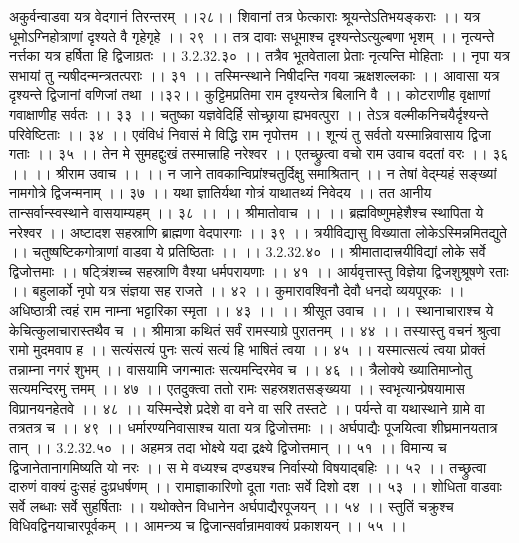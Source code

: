 अकुर्वन्वाडवा यत्र वेदगानं तिरन्तरम् ।।२८।।
शिवानां तत्र फेत्काराः श्रूयन्तेऽतिभयङ्कराः ।।
यत्र धूमोऽग्निहोत्राणां दृश्यते वै गृहेगृहे ।। २९ ।।
तत्र दावाः सधूमाश्च दृश्यन्तेऽत्युल्बणा भृशम् ।।
नृत्यन्ते नर्त्तका यत्र हर्षिता हि द्विजाग्रतः ।। 3.2.32.३० ।।
तत्रैव भूतवेताला प्रेताः नृत्यन्ति मोहिताः ।।
नृपा यत्र सभायां तु न्यषीदन्मन्त्रतत्पराः ।। ३१ ।।
तस्मिन्स्थाने निषीदन्ति गवया ऋक्षशल्लकाः ।।
आवासा यत्र दृश्यन्ते द्विजानां वणिजां तथा ।।३२।।
कुट्टिमप्रतिमा राम दृश्यन्तेत्र बिलानि वै ।।
कोटराणीह वृक्षाणां गवाक्षाणीह सर्वतः ।। ३३ ।।
चतुष्का यज्ञवेदिर्हि सोच्छ्राया ह्यभवत्पुरा ।।
तेऽत्र वल्मीकनिचयैर्दृश्यन्ते परिवेष्टिताः ।। ३४ ।।
एवंविधं निवासं मे विद्धि राम नृपोत्तम ।।
शून्यं तु सर्वतो यस्मान्निवासाय द्विजा गताः ।। ३५ ।।
तेन मे सुमहद्दुःखं तस्मात्त्राहि नरेश्वर ।।
एतच्छ्रुत्वा वचो राम उवाच वदतां वरः ।। ३६ ।।
।। श्रीराम उवाच ।। ।।
न जाने तावकान्विप्रांश्चतुर्दिक्षु समाश्रितान् ।।
न तेषां वेद्म्यहं सङ्ख्यां नामगोत्रे द्विजन्मनाम् ।। ३७ ।।
यथा ज्ञातिर्यथा गोत्रं याथातथ्यं निवेदय ।।
तत आनीय तान्सर्वान्स्वस्थाने वासयाम्यहम् ।। ३८ ।।
।। श्रीमातोवाच ।। ।।
ब्रह्मविष्णुमहेशैश्च स्थापिता ये नरेश्वर ।।
अष्टादश सहस्राणि ब्राह्मणा वेदपारगाः ।। ३९ ।।
त्रयीविद्यासु विख्याता लोकेऽस्मिन्नमितद्युते ।।
चतुष्षष्टिकगोत्राणां वाडवा ये प्रतिष्ठिताः ।। ।। 3.2.32.४० ।।
श्रीमातादात्त्रयीविद्यां लोके सर्वे द्विजोत्तमाः ।।
षट्त्रिंशच्च सहस्राणि वैश्या धर्मपरायणाः ।। ४१ ।।
आर्यवृत्तास्तु विज्ञेया द्विजशुश्रूषणे रताः ।।
बहुलार्को नृपो यत्र संज्ञया सह राजते ।। ४२ ।।
कुमारावश्विनौ देवौ धनदो व्ययपूरकः ।।
अधिष्ठात्री त्वहं राम नाम्ना भट्टारिका स्मृता ।। ४३ ।।
।। श्रीसूत उवाच ।। ।।
स्थानाचाराश्च ये केचित्कुलाचारास्तथैव च ।।
श्रीमात्रा कथितं सर्वं रामस्याग्रे पुरातनम् ।। ४४ ।।
तस्यास्तु वचनं श्रुत्वा रामो मुदमवाप ह ।।
सत्यंसत्यं पुनः सत्यं सत्यं हि भाषितं त्वया ।। ४५ ।।
यस्मात्सत्यं त्वया प्रोक्तं तन्नाम्ना नगरं शुभम् ।।
वासयामि जगन्मातः सत्यमन्दिरमेव च ।। ४६ ।।
त्रैलोक्ये ख्यातिमाप्नोतु सत्यमन्दिरमु त्तमम् ।। ४७ ।।
एतदुक्त्वा ततो रामः सहस्रशतसङ्ख्यया ।।
स्वभृत्यान्प्रेषयामास विप्रानयनहेतवे ।। ४८ ।।
यस्मिन्देशे प्रदेशे वा वने वा सरि तस्तटे ।।
पर्यन्ते वा यथास्थाने ग्रामे वा तत्रतत्र च ।। ४९ ।।
धर्मारण्यनिवासाश्च याता यत्र द्विजोत्तमाः ।।
अर्घपाद्यैः पूजयित्वा शीघ्रमानयतात्र तान् ।। 3.2.32.५० ।।
अहमत्र तदा भोक्ष्ये यदा द्रक्ष्ये द्विजोत्तमान् ।। ५१ ।।
विमान्य च द्विजानेतानागमिष्यति यो नरः ।।
स मे वध्यश्च दण्ड्यश्च निर्वास्यो विषयाद्बहिः ।। ५२ ।।
तच्छ्रुत्वा दारुणं वाक्यं दुःसहं दुःप्रधर्षणम् ।।
रामाज्ञाकारिणो दूता गताः सर्वे दिशो दश ।। ५३ ।।
शोधिता वाडवाः सर्वे लब्धाः सर्वे सुहर्षिताः ।।
यथोक्तेन विधानेन अर्घपाद्यैरपूजयन् ।। ५४ ।।
स्तुतिं चक्रुश्च विधिवद्विनयाचारपूर्वकम् ।।
आमन्त्र्य च द्विजान्सर्वान्रामवाक्यं प्रकाशयन् ।। ५५ ।।
